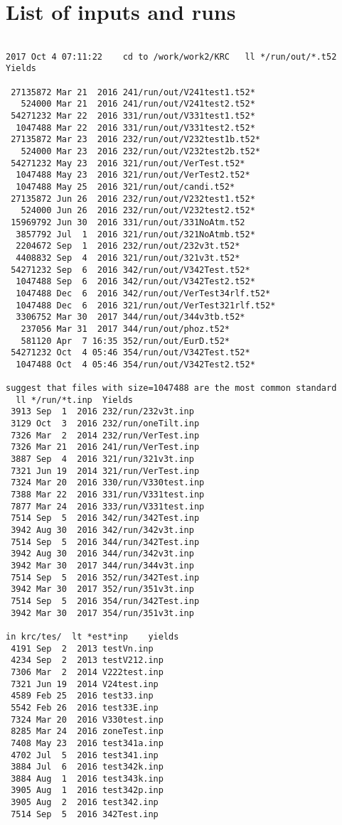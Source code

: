 \documentclass{article}
\begin{document}
\section{List of inputs and runs}
\vspace{-3.mm} 
\begin{verbatim}

2017 Oct 4 07:11:22    cd to /work/work2/KRC   ll */run/out/*.t52  Yields

 27135872 Mar 21  2016 241/run/out/V241test1.t52*
   524000 Mar 21  2016 241/run/out/V241test2.t52*
 54271232 Mar 22  2016 331/run/out/V331test1.t52*
  1047488 Mar 22  2016 331/run/out/V331test2.t52*
 27135872 Mar 23  2016 232/run/out/V232test1b.t52*
   524000 Mar 23  2016 232/run/out/V232test2b.t52*
 54271232 May 23  2016 321/run/out/VerTest.t52*
  1047488 May 23  2016 321/run/out/VerTest2.t52*
  1047488 May 25  2016 321/run/out/candi.t52*
 27135872 Jun 26  2016 232/run/out/V232test1.t52*
   524000 Jun 26  2016 232/run/out/V232test2.t52*
 15969792 Jun 30  2016 331/run/out/331NoAtm.t52
  3857792 Jul  1  2016 321/run/out/321NoAtmb.t52*
  2204672 Sep  1  2016 232/run/out/232v3t.t52*
  4408832 Sep  4  2016 321/run/out/321v3t.t52*
 54271232 Sep  6  2016 342/run/out/V342Test.t52*
  1047488 Sep  6  2016 342/run/out/V342Test2.t52*
  1047488 Dec  6  2016 342/run/out/VerTest34rlf.t52*
  1047488 Dec  6  2016 321/run/out/VerTest321rlf.t52*
  3306752 Mar 30  2017 344/run/out/344v3tb.t52*
   237056 Mar 31  2017 344/run/out/phoz.t52*
   581120 Apr  7 16:35 352/run/out/EurD.t52*
 54271232 Oct  4 05:46 354/run/out/V342Test.t52*
  1047488 Oct  4 05:46 354/run/out/V342Test2.t52*

suggest that files with size=1047488 are the most common standard
  ll */run/*t.inp  Yields
 3913 Sep  1  2016 232/run/232v3t.inp
 3129 Oct  3  2016 232/run/oneTilt.inp
 7326 Mar  2  2014 232/run/VerTest.inp
 7326 Mar 21  2016 241/run/VerTest.inp
 3887 Sep  4  2016 321/run/321v3t.inp
 7321 Jun 19  2014 321/run/VerTest.inp
 7324 Mar 20  2016 330/run/V330test.inp
 7388 Mar 22  2016 331/run/V331test.inp
 7877 Mar 24  2016 333/run/V331test.inp
 7514 Sep  5  2016 342/run/342Test.inp
 3942 Aug 30  2016 342/run/342v3t.inp
 7514 Sep  5  2016 344/run/342Test.inp
 3942 Aug 30  2016 344/run/342v3t.inp
 3942 Mar 30  2017 344/run/344v3t.inp
 7514 Sep  5  2016 352/run/342Test.inp
 3942 Mar 30  2017 352/run/351v3t.inp
 7514 Sep  5  2016 354/run/342Test.inp
 3942 Mar 30  2017 354/run/351v3t.inp

in krc/tes/  lt *est*inp    yields
 4191 Sep  2  2013 testVn.inp
 4234 Sep  2  2013 testV212.inp
 7306 Mar  2  2014 V222test.inp
 7321 Jun 19  2014 V24test.inp
 4589 Feb 25  2016 test33.inp
 5542 Feb 26  2016 test33E.inp
 7324 Mar 20  2016 V330test.inp
 8285 Mar 24  2016 zoneTest.inp
 7408 May 23  2016 test341a.inp
 4702 Jul  5  2016 test341.inp
 3884 Jul  6  2016 test342k.inp
 3884 Aug  1  2016 test343k.inp
 3905 Aug  1  2016 test342p.inp
 3905 Aug  2  2016 test342.inp
 7514 Sep  5  2016 342Test.inp


\end{verbatim}
\end{document}
